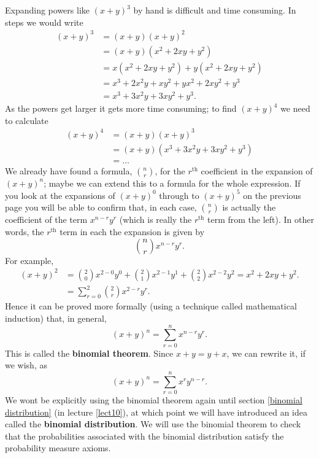 \noindent Expanding powers like $(x + y)^3$ by hand is difficult and time consuming. In steps we would write
\begin{align*}
(x + y)^3 & = (x+y)(x+y)^2 \\
		& = (x + y)(x^2 + 2xy + y^2) \\
		& = x(x^2 + 2xy + y^2) + y(x^2 + 2xy + y^2) \\
		& = x^3 + 2x^2y + xy^2 + yx^2 + 2xy^2 + y^3 \\
		& = x^3 + 3x^2y + 3xy^2 + y^3.
\end{align*}
As the powers get larger it gets more time consuming; to find $(x+y)^4$ we need to calculate
\begin{align*}
(x+y)^4 & = (x+y)(x+y)^3 \\
	      & = (x+y)(x^3 + 3x^2y + 3xy^2 + y^3) \tag{using our result for $(x+y)^3$} \\
	      & = \ldots
\end{align*}
We already have found a formula, $\binom{n}{r}$, for the $r^{\text{th}}$ coefficient in the expansion of $(x + y)^n$; maybe we can extend this to a formula for the whole expression. If you look at the expansions of $(x+y)^0$ through to $(x+y)^5$ on the previous page you will be able to confirm that, in each case, $\binom{n}{r}$ is actually the coefficient of the term $x^{n-r}y^{r}$ (which is really the $r^{\text{th}}$ term from the left). In other words, the $r^{\text{th}}$ term in each the expansion is given by
\[
\binom{n}{r}x^{n-r}y^{r}.
\]
For example,
\begin{align*}
(x+y)^2 & = \binom{2}{0}x^{2-0}y^{0} + \binom{2}{1}x^{2-1}y^1 + \binom{2}{2}x^{2-2}y^2 = x^2 + 2xy + y^2. \\
	     & = \sum_{r=0}^2 \binom{2}{r}x^{2-r}y^{r}.
\end{align*}
Hence it can be proved more formally (using a technique called mathematical induction) that, in general,
\[
(x+y)^n = \sum_{r = 0}^n x^{n-r}y^r.
\]
This is called the \textbf{binomial theorem}. Since $x+y = y+x$, we can rewrite it, if we wish, as
\[
(x+y)^n = \sum_{r = 0}^n x^{r}y^{n-r}.
\]
We wont be explicitly using the binomial theorem again until section \ref{binomial distribution} (in lecture \ref{lect10}), at which point we will have introduced an idea called the \textbf{binomial distribution}. We will use the binomial theorem to check that the probabilities associated with the binomial distribution satisfy the probability measure axioms.